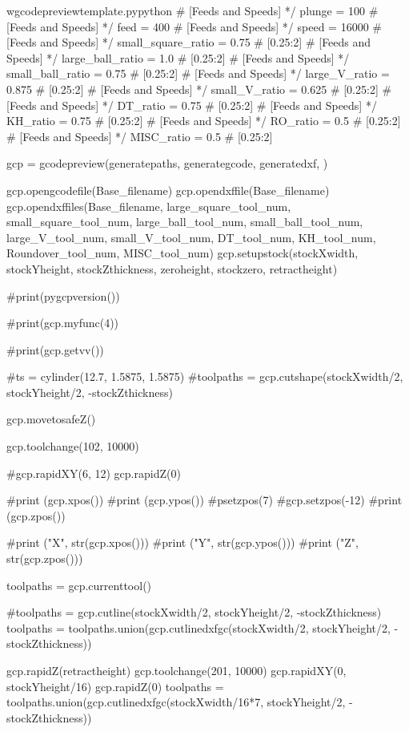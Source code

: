\documentclass{ltxdoc}
\begin{document}
\begin{writecode}{w}{gcodepreviewtemplate.py}{python}
# [Feeds and Speeds] */
plunge = 100
# [Feeds and Speeds] */
feed = 400
# [Feeds and Speeds] */
speed = 16000
# [Feeds and Speeds] */
small_square_ratio = 0.75  # [0.25:2]
# [Feeds and Speeds] */
large_ball_ratio = 1.0  # [0.25:2]
# [Feeds and Speeds] */
small_ball_ratio = 0.75  # [0.25:2]
# [Feeds and Speeds] */
large_V_ratio = 0.875  # [0.25:2]
# [Feeds and Speeds] */
small_V_ratio = 0.625  # [0.25:2]
# [Feeds and Speeds] */
DT_ratio = 0.75  # [0.25:2]
# [Feeds and Speeds] */
KH_ratio = 0.75  # [0.25:2]
# [Feeds and Speeds] */
RO_ratio = 0.5  # [0.25:2]
# [Feeds and Speeds] */
MISC_ratio = 0.5  # [0.25:2]

gcp = gcodepreview(generatepaths, 
                   generategcode, 
                   generatedxf, 
                   )

gcp.opengcodefile(Base_filename)
gcp.opendxffile(Base_filename)
gcp.opendxffiles(Base_filename, 
                 large_square_tool_num, 
                 small_square_tool_num, 
                 large_ball_tool_num, 
                 small_ball_tool_num, 
                 large_V_tool_num, 
                 small_V_tool_num, 
                 DT_tool_num, 
                 KH_tool_num, 
                 Roundover_tool_num, 
                 MISC_tool_num)
gcp.setupstock(stockXwidth, stockYheight, stockZthickness, zeroheight, stockzero, retractheight)

#print(pygcpversion())

#print(gcp.myfunc(4))

#print(gcp.getvv())

#ts = cylinder(12.7, 1.5875, 1.5875)
#toolpaths = gcp.cutshape(stockXwidth/2, stockYheight/2, -stockZthickness)

gcp.movetosafeZ()

gcp.toolchange(102, 10000)

#gcp.rapidXY(6, 12)
gcp.rapidZ(0)

#print (gcp.xpos())
#print (gcp.ypos())
#psetzpos(7)
#gcp.setzpos(-12)
#print (gcp.zpos())

#print ("X", str(gcp.xpos()))
#print ("Y", str(gcp.ypos()))
#print ("Z", str(gcp.zpos()))

toolpaths = gcp.currenttool()

#toolpaths = gcp.cutline(stockXwidth/2, stockYheight/2, -stockZthickness)
toolpaths = toolpaths.union(gcp.cutlinedxfgc(stockXwidth/2, stockYheight/2, -stockZthickness))

gcp.rapidZ(retractheight)
gcp.toolchange(201, 10000)
gcp.rapidXY(0, stockYheight/16)
gcp.rapidZ(0)
toolpaths = toolpaths.union(gcp.cutlinedxfgc(stockXwidth/16*7, stockYheight/2, -stockZthickness))


\end{writecode}
\end{document}
